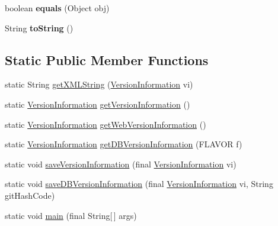 \begin{DoxyCompactItemize}
\item 
\hypertarget{classgov_1_1fnal_1_1ppd_1_1dd_1_1util_1_1version_1_1VersionInformation_a2e640db116e069eabbc9f16b98678ca4}{boolean {\bfseries equals} (Object obj)}\label{classgov_1_1fnal_1_1ppd_1_1dd_1_1util_1_1version_1_1VersionInformation_a2e640db116e069eabbc9f16b98678ca4}

\item 
\hypertarget{classgov_1_1fnal_1_1ppd_1_1dd_1_1util_1_1version_1_1VersionInformation_ae6b3fbd1f3fd907536651c2a7d8160f0}{String {\bfseries to\-String} ()}\label{classgov_1_1fnal_1_1ppd_1_1dd_1_1util_1_1version_1_1VersionInformation_ae6b3fbd1f3fd907536651c2a7d8160f0}

\end{DoxyCompactItemize}
\subsection*{Static Public Member Functions}
\begin{DoxyCompactItemize}
\item 
static String \hyperlink{classgov_1_1fnal_1_1ppd_1_1dd_1_1util_1_1version_1_1VersionInformation_afa85eafcdf7b652d768aef96624738d4}{get\-X\-M\-L\-String} (\hyperlink{classgov_1_1fnal_1_1ppd_1_1dd_1_1util_1_1version_1_1VersionInformation}{Version\-Information} vi)
\item 
static \hyperlink{classgov_1_1fnal_1_1ppd_1_1dd_1_1util_1_1version_1_1VersionInformation}{Version\-Information} \hyperlink{classgov_1_1fnal_1_1ppd_1_1dd_1_1util_1_1version_1_1VersionInformation_ae3b271fb533ff507acae7aeccbe4ffef}{get\-Version\-Information} ()
\item 
static \hyperlink{classgov_1_1fnal_1_1ppd_1_1dd_1_1util_1_1version_1_1VersionInformation}{Version\-Information} \hyperlink{classgov_1_1fnal_1_1ppd_1_1dd_1_1util_1_1version_1_1VersionInformation_a35a9492897005a8a48cfd9289dc9edff}{get\-Web\-Version\-Information} ()
\item 
static \hyperlink{classgov_1_1fnal_1_1ppd_1_1dd_1_1util_1_1version_1_1VersionInformation}{Version\-Information} \hyperlink{classgov_1_1fnal_1_1ppd_1_1dd_1_1util_1_1version_1_1VersionInformation_afccd7186968a5736b034f8600df1287b}{get\-D\-B\-Version\-Information} (F\-L\-A\-V\-O\-R f)
\item 
static void \hyperlink{classgov_1_1fnal_1_1ppd_1_1dd_1_1util_1_1version_1_1VersionInformation_ad92c421c9291308bc422e9b383b0fc4d}{save\-Version\-Information} (final \hyperlink{classgov_1_1fnal_1_1ppd_1_1dd_1_1util_1_1version_1_1VersionInformation}{Version\-Information} vi)
\item 
static void \hyperlink{classgov_1_1fnal_1_1ppd_1_1dd_1_1util_1_1version_1_1VersionInformation_afaa42342d99f1517e1a672b24f1f725a}{save\-D\-B\-Version\-Information} (final \hyperlink{classgov_1_1fnal_1_1ppd_1_1dd_1_1util_1_1version_1_1VersionInformation}{Version\-Information} vi, String git\-Hash\-Code)
\item 
static void \hyperlink{classgov_1_1fnal_1_1ppd_1_1dd_1_1util_1_1version_1_1VersionInformation_a1f1c0fa39067225a137925368674d424}{main} (final String\mbox{[}$\,$\mbox{]} args)
\end{DoxyCompactItemize}


